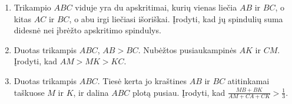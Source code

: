 \begin{enumerate}
\item Trikampio $ABC$ viduje yra du apskritimai, kurių vienas 
  liečia $AB$ ir $BC$, o kitas $AC$ ir $BC$, o abu irgi liečiasi 
  išoriškai. Įrodyti, kad jų spindulių suma didesnė nei
   įbrėžto apskritimo spindulys.

\item Duotas trikampis $ABC$, $AB>BC$. Nubėžtos pusiaukampinės
  $AK$ ir $CM$. Įrodyti, kad $AM>MK>KC$.

\item Duotas trikampis $ABC$. Tiesė kerta jo 
  kraštines $AB$ ir $BC$ atitinkamai taškuose $M$ ir $K$,
  ir dalina $ABC$ plotą pusiau. Įrodyti, kad 
  $\frac{MB+BK}{AM+CA+CK}>\frac{1}{3}$.

  \end{enumerate}
